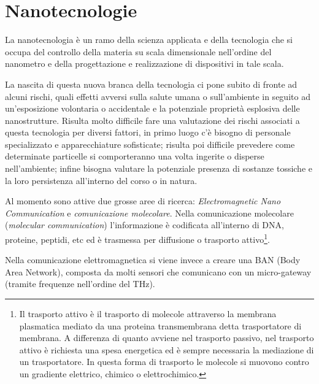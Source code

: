 \section{Nanotecnologie}

	La nanotecnologia è un ramo della scienza applicata e della tecnologia che si occupa del controllo della materia su scala dimensionale nell'ordine del nanometro e della progettazione e realizzazione di dispositivi in tale scala.
	
	La nascita di questa nuova branca della tecnologia ci pone subito di fronte ad alcuni rischi, quali effetti avversi sulla salute umana o sull'ambiente in seguito ad un'esposizione volontaria o accidentale e la potenziale proprietà esplosiva delle nanostrutture.
	Risulta molto difficile fare una valutazione dei rischi associati a questa tecnologia per diversi fattori,
	in primo luogo c'è bisogno di personale specializzato e apparecchiature sofisticate;
	risulta poi difficile prevedere come determinate particelle si comporteranno una volta ingerite o disperse nell'ambiente; infine bisogna valutare la potenziale presenza di sostanze tossiche e la loro persistenza all'interno del corso o in natura.
	
	Al momento sono attive due grosse aree di ricerca: \emph{Electromagnetic Nano Communication} e \emph{comunicazione molecolare}.
	Nella comunicazione molecolare (\emph{molecular communication}) l'informazione è codificata all'interno di DNA, proteine, peptidi, etc ed è trasmessa per diffusione o trasporto attivo\footnote{Il trasporto attivo è il trasporto di molecole attraverso la membrana plasmatica mediato da una proteina transmembrana detta trasportatore di membrana.
		A differenza di quanto avviene nel trasporto passivo, nel trasporto attivo è richiesta una spesa energetica ed è sempre necessaria la mediazione di un trasportatore.
		In questa forma di trasporto le molecole si muovono contro un gradiente elettrico, chimico o elettrochimico.}.
	
	Nella comunicazione elettromagnetica si viene invece a creare una BAN (Body Area Network), composta da molti sensori che comunicano con un micro-gateway (tramite frequenze nell'ordine del THz).
	

